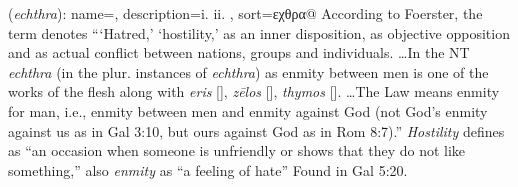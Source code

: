 \item[Hostility,]

(\textit{echthra}):
{
    name=,
    description={i.  ii. },
    sort=εχθρα@
}
According to Foerster, the term denotes ```Hatred,' `hostility,' as an inner disposition, as objective opposition and as actual conflict between nations, groups and individuals. \ldots In the NT \emph{echthra} (in the plur. instances of \emph{echthra}) as enmity between men is one of the works of the flesh along with \emph{eris} [], \emph{zēlos} [], \emph{thymos} []. \ldots The Law means enmity for man, i.e., enmity between men and enmity against God (not God's enmity against us as in Gal 3:10, but ours against God as in Rom 8:7).'' 
\emph{Hostility} defines as ``an occasion when someone is unfriendly or shows that they do not like something,'' also \emph{enmity} as ``a feeling of hate''
Found in Gal 5:20.
